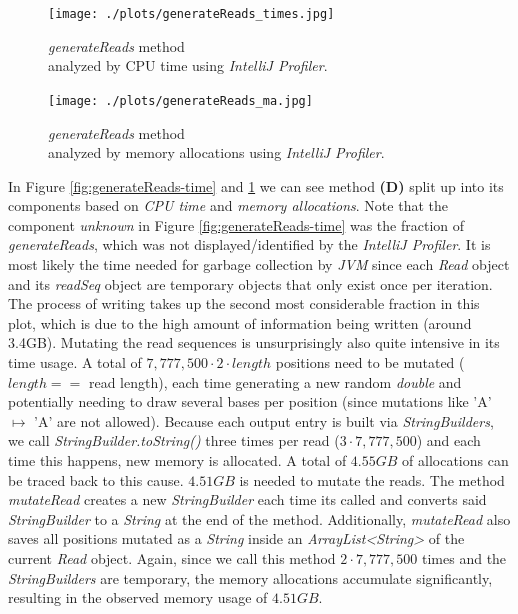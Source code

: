\documentclass[12pt]{article}
\begin{document}
\begin{figure}[t]
    \centering
    \begin{minipage}[t]{0.45\textwidth} 
        \centering
        \texttt{[image: ./plots/generateReads\_times.jpg]} 
        \caption{\textit{generateReads} method\\ analyzed by CPU time using \textit{IntelliJ Profiler}.}
        \label{fig:generateReads-time}
    \end{minipage}
    \hfill
    \begin{minipage}[t]{0.45\textwidth}
        \centering
        \texttt{[image: ./plots/generateReads\_ma.jpg]}
        \caption{\textit{generateReads} method\\ analyzed by memory allocations using \textit{IntelliJ Profiler}.}
        \label{fig:generateReads-ma}
    \end{minipage}
\end{figure}
In Figure \ref{fig:generateReads-time} and \ref{fig:generateReads-ma} we can see method \textbf{(D)} split up 
into its components based on \textit{CPU time} and \textit{memory allocations}.
Note that the component \textit{unknown} in Figure \ref{fig:generateReads-time} was the fraction of \textit{generateReads}, which was not 
displayed/identified by the \textit{IntelliJ Profiler}. It is most likely the time needed for garbage collection by \textit{JVM} since each \textit{Read} object
and its \textit{readSeq} object are temporary objects that only exist once per iteration.
The process of writing takes up the second most considerable fraction in this plot, which is due to the 
high amount of information being written (around 3.4GB). Mutating the read sequences is unsurprisingly also 
quite intensive in its time usage. A total of $7,777,500 \cdot 2 \cdot length$ positions need to be mutated ($length ==$ read length), each time 
generating a new random \textit{double} and potentially needing to draw several bases per position (since mutations like 
'A' $\mapsto$ 'A' are not allowed). 
Because each output entry is built via \textit{StringBuilders}, we call \textit{StringBuilder.toString()} three times per read
($3 \cdot 7,777,500$) and each time this happens, new memory is allocated. A total of $4.55 GB$ of allocations can be traced 
back to this cause.
$4.51GB$ is needed to mutate the reads. The method \textit{mutateRead} creates a new \textit{StringBuilder} each time its called and converts said \textit{StringBuilder} to a \textit{String}
at the end of the method. Additionally, \textit{mutateRead} also saves all positions mutated as a \textit{String} inside an \textit{ArrayList<String>} of the 
current \textit{Read} object. Again, since we call this method $2 \cdot 7,777,500$ times and the \textit{StringBuilders} are temporary, 
the memory allocations accumulate significantly, resulting in the observed memory usage of $4.51GB$.
\end{document}
